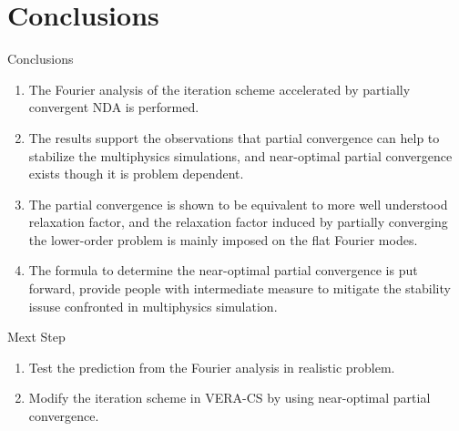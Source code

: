 \section{Conclusions}

\begin{frame}{Conclusions }
\begin{enumerate}
    \item The Fourier analysis of the iteration scheme accelerated by partially convergent NDA is performed. 
    \item The results support the observations that partial convergence can help to stabilize the multiphysics simulations, and near-optimal partial convergence exists though it is problem dependent.

    \item The partial convergence is shown to be equivalent to more well understood relaxation factor, and the relaxation factor induced by partially converging the lower-order problem is mainly imposed on the flat Fourier modes.

    \item The formula to determine the near-optimal partial convergence is put forward, provide people with intermediate measure to mitigate the stability issuse confronted in multiphysics simulation. 
\end{enumerate}
\end{frame}

\begin{frame}{Mext Step}
\begin{enumerate}
    \item Test the prediction from the Fourier analysis in realistic problem.
    \vspace{2em}
    \item Modify the iteration scheme in VERA-CS by using near-optimal partial convergence.
    \vspace{2em}
\end{enumerate}
 \end{frame}

